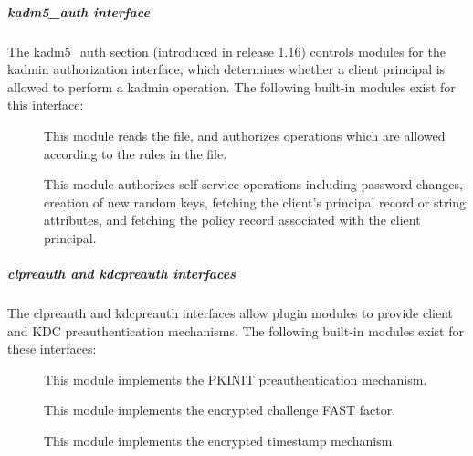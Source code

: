 \documentclass[letterpaper,10pt,english]{sphinxmanual}
\begin{document}
\subparagraph{kadm5\_auth interface}
\label{\detokenize{admin/conf_files/krb5_conf:kadm5-auth-interface}}\label{\detokenize{admin/conf_files/krb5_conf:kadm5-auth}}
The kadm5\_auth section (introduced in release 1.16) controls modules
for the kadmin authorization interface, which determines whether a
client principal is allowed to perform a kadmin operation.  The
following built-in modules exist for this interface:
\begin{description}
\item[{}] \leavevmode
This module reads the {\hyperref[\detokenize{admin/conf_files/kadm5_acl:kadm5-acl-5}]{}} file, and authorizes
operations which are allowed according to the rules in the file.

\item[{}] \leavevmode
This module authorizes self-service operations including password
changes, creation of new random keys, fetching the client’s
principal record or string attributes, and fetching the policy
record associated with the client principal.

\end{description}
\label{\detokenize{admin/conf_files/krb5_conf:clpreauth}}

\subparagraph{clpreauth and kdcpreauth interfaces}
\label{\detokenize{admin/conf_files/krb5_conf:clpreauth-and-kdcpreauth-interfaces}}\label{\detokenize{admin/conf_files/krb5_conf:clpreauth}}\label{\detokenize{admin/conf_files/krb5_conf:kdcpreauth}}
The clpreauth and kdcpreauth interfaces allow plugin modules to
provide client and KDC preauthentication mechanisms.  The following
built-in modules exist for these interfaces:
\begin{description}
\item[{}] \leavevmode
This module implements the PKINIT preauthentication mechanism.

\item[{}] \leavevmode
This module implements the encrypted challenge FAST factor.

\item[{}] \leavevmode
This module implements the encrypted timestamp mechanism.

\end{description}
\end{document}
